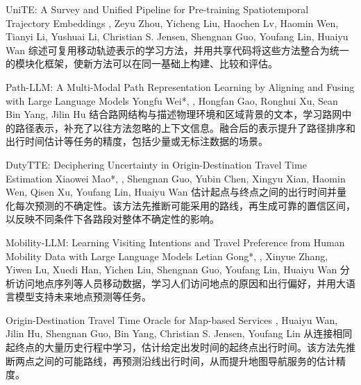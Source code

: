 {UniTE: A Survey and Unified Pipeline for Pre-training Spatiotemporal Trajectory Embeddings}
{\me, Zeyu Zhou, Yicheng Liu, Haochen Lv, Haomin Wen, Tianyi Li, Yushuai Li, Christian S. Jensen, Shengnan Guo, Youfang Lin, Huaiyu Wan}
{综述可复用移动轨迹表示的学习方法，并用共享代码将这些方法整合为统一的模块化框架，使新方法可以在同一基础上构建、比较和评估。}

{Path-LLM: A Multi-Modal Path Representation Learning by Aligning and Fusing with Large Language Models}
{Yongfu Wei*, \me*, Hongfan Gao, Ronghui Xu, Sean Bin Yang, Jilin Hu}
{结合路网结构与描述物理环境和区域背景的文本，学习路网中的路径表示，补充了以往方法忽略的上下文信息。融合后的表示提升了路径排序和出行时间估计等任务的精度，包括少量或无标注数据的场景。}

{DutyTTE: Deciphering Uncertainty in Origin-Destination Travel Time Estimation}
{Xiaowei Mao*, \me*, Shengnan Guo, Yubin Chen, Xingyu Xian, Haomin Wen, Qisen Xu, Youfang Lin, Huaiyu Wan}
{估计起点与终点之间的出行时间并量化每次预测的不确定性。该方法先推断可能采用的路线，再生成可靠的置信区间，以反映不同条件下各路段对整体不确定性的影响。}

{Mobility-LLM: Learning Visiting Intentions and Travel Preference from Human Mobility Data with Large Language Models}
{Letian Gong*, \me*, Xinyue Zhang, Yiwen Lu, Xuedi Han, Yichen Liu, Shengnan Guo, Youfang Lin, Huaiyu Wan}
{分析访问地点序列等人员移动数据，学习人们访问地点的原因和出行偏好，并用大语言模型支持未来地点预测等任务。}

{Origin-Destination Travel Time Oracle for Map-based Services}
{\me, Huaiyu Wan, Jilin Hu, Shengnan Guo, Bin Yang, Christian S. Jensen, Youfang Lin}
{从连接相同起终点的大量历史行程中学习，估计给定出发时间的起终点出行时间。该方法先推断两点之间的可能路线，再预测沿线出行时间，从而提升地图导航服务的估计精度。}

